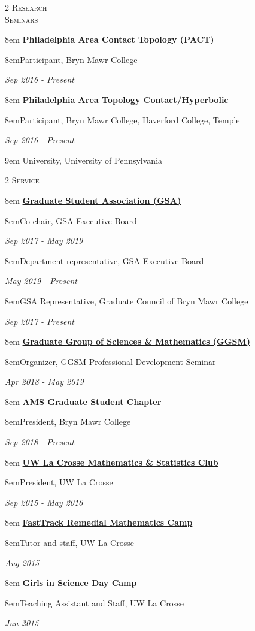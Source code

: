 \documentclass[11pt]{article}
\newcommand{\itemreg}[1]{\begin{addmargin}[0em]{8em} #1 \end{addmargin}}
\newcommand{\itemregind}[1]{\begin{addmargin}[1.75em]{9em} #1 \end{addmargin}}
\newcommand{\iteminddate}[2]{\begin{addmargin}[1.75em]{8em}#1\end{addmargin}\vspace{-1.15em}\hfill\textit{#2}\\}
\begin{document}
\begin{multicols}{2}
	\textsc{Research \\ Seminars}
	
	\columnbreak
	
	\itemreg{\textbf{Philadelphia Area Contact Topology (PACT)}}
		\iteminddate{Participant, Bryn Mawr College}{Sep 2016 - Present}
	\vspace{.35em}
	\itemreg{\textbf{Philadelphia Area Topology Contact/Hyperbolic}}
		\iteminddate{Participant, Bryn Mawr College, Haverford College, Temple}{Sep 2016 - Present}
		\itemregind{University, University of Pennsylvania}
	
\end{multicols}
\vspace{-.5em}



\begin{multicols}{2}
	\textsc{Service}
	
	\columnbreak
	
	\itemreg{\textbf{\href{https://www.brynmawr.edu/gsas/}{Graduate Student Association (GSA)}}}
		\iteminddate{Co-chair, GSA Executive Board}{Sep 2017 - May 2019}
		\iteminddate{Department representative, GSA Executive Board}{May 2019 - Present}
		\iteminddate{GSA Representative, Graduate Council of Bryn Mawr College}{Sep 2017 - Present}
		\vspace{.35em}
		
	\itemreg{\textbf{\href{https://www.brynmawr.edu/ggsm}{Graduate Group of Sciences \& Mathematics (GGSM)}}}
		\iteminddate{Organizer, GGSM Professional Development Seminar}{Apr 2018 - May 2019}
		\vspace{.35em}
		
	\itemreg{\textbf{\href{http://www.ams.org/programs/studentchapters}{AMS Graduate Student Chapter}}}
		\iteminddate{President, Bryn Mawr College}{Sep 2018 - Present}
		\vspace{.35em}
		
	\itemreg{\textbf{\href{https://www.uwlax.edu/mathematics/activities/mathematics-and-stats-club/}{UW La Crosse Mathematics \& Statistics Club}}}
		\iteminddate{President, UW La Crosse}{Sep 2015 - May 2016}
		\vspace{.35em}
	
	\itemreg{\textbf{\href{https://www.uwlax.edu/mathematics/fasttrack/}{FastTrack Remedial Mathematics Camp}}}
		\iteminddate{Tutor and staff, UW La Crosse}{Aug 2015}
		\vspace{.35em}
	
	\itemreg{\textbf{\href{https://www.uwlax.edu/conted/youth-programs/girls-in-science/welcome/}{Girls in Science Day Camp}}}
		\iteminddate{Teaching Assistant and Staff, UW La Crosse}{Jun 2015}
\end{multicols}
\end{document}
